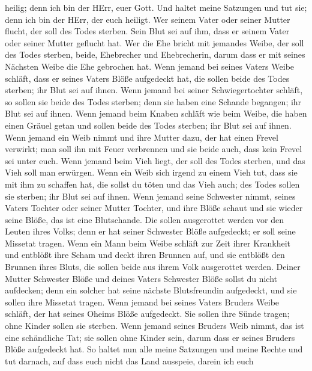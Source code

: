 heilig; denn ich bin der HErr, euer Gott.  Und haltet meine
Satzungen und tut sie; denn ich bin der HErr, der euch heiligt.
 Wer seinem Vater oder seiner Mutter flucht, der soll des
Todes sterben. Sein Blut sei auf ihm, dass er seinem Vater oder seiner
Mutter geflucht hat.  Wer die Ehe bricht mit jemandes
Weibe, der soll des Todes sterben, beide, Ehebrecher und Ehebrecherin,
darum dass er mit seines Nächsten Weibe die Ehe gebrochen hat.
 Wenn jemand bei seines Vaters Weibe schläft, dass er
seines Vaters Blöße aufgedeckt hat, die sollen beide des Todes sterben;
ihr Blut sei auf ihnen.  Wenn jemand bei seiner
Schwiegertochter schläft, so sollen sie beide des Todes sterben; denn
sie haben eine Schande begangen; ihr Blut sei auf ihnen. 
Wenn jemand beim Knaben schläft wie beim Weibe, die haben einen Gräuel
getan und sollen beide des Todes sterben; ihr Blut sei auf ihnen.
 Wenn jemand ein Weib nimmt und ihre Mutter dazu, der hat
einen Frevel verwirkt; man soll ihn mit Feuer verbrennen und sie beide
auch, dass kein Frevel sei unter euch.  Wenn jemand beim
Vieh liegt, der soll des Todes sterben, und das Vieh soll man erwürgen.
 Wenn ein Weib sich irgend zu einem Vieh tut, dass sie mit
ihm zu schaffen hat, die sollst du töten und das Vieh auch; des Todes
sollen sie sterben; ihr Blut sei auf ihnen.  Wenn jemand
seine Schwester nimmt, seines Vaters Tochter oder seiner Mutter Tochter,
und ihre Blöße schaut und sie wieder seine Blöße, das ist eine
Blutschande. Die sollen ausgerottet werden vor den Leuten ihres Volks;
denn er hat seiner Schwester Blöße aufgedeckt; er soll seine Missetat
tragen.  Wenn ein Mann beim Weibe schläft zur Zeit ihrer
Krankheit und entblößt ihre Scham und deckt ihren Brunnen auf, und sie
entblößt den Brunnen ihres Bluts, die sollen beide aus ihrem Volk
ausgerottet werden.  Deiner Mutter Schwester Blöße und
deines Vaters Schwester Blöße sollst du nicht aufdecken; denn ein
solcher hat seine nächste Blutsfreundin aufgedeckt, und sie sollen ihre
Missetat tragen.  Wenn jemand bei seines Vaters Bruders
Weibe schläft, der hat seines Oheims Blöße aufgedeckt. Sie sollen ihre
Sünde tragen; ohne Kinder sollen sie sterben.  Wenn jemand
seines Bruders Weib nimmt, das ist eine schändliche Tat; sie sollen ohne
Kinder sein, darum dass er seines Bruders Blöße aufgedeckt hat.
 So haltet nun alle meine Satzungen und meine Rechte und
tut darnach, auf dass euch nicht das Land ausspeie, darein ich euch
